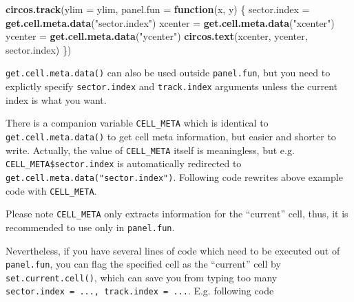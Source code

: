 \documentclass[]{book}
\newenvironment{Shaded}{\begin{snugshade}}{\end{snugshade}}
\newcommand{\KeywordTok}[1]{\textcolor[rgb]{0.13,0.29,0.53}{\textbf{#1}}}
\newcommand{\DataTypeTok}[1]{\textcolor[rgb]{0.13,0.29,0.53}{#1}}
\newcommand{\StringTok}[1]{\textcolor[rgb]{0.31,0.60,0.02}{#1}}
\newcommand{\ControlFlowTok}[1]{\textcolor[rgb]{0.13,0.29,0.53}{\textbf{#1}}}
\newcommand{\OperatorTok}[1]{\textcolor[rgb]{0.81,0.36,0.00}{\textbf{#1}}}
\newcommand{\NormalTok}[1]{#1}
\begin{document}
\begin{Shaded}
\begin{Highlighting}[]
\KeywordTok{circos.track}\NormalTok{(}\DataTypeTok{ylim =}\NormalTok{ ylim, }\DataTypeTok{panel.fun =} \ControlFlowTok{function}\NormalTok{(x, y) \{}
\NormalTok{    sector.index =}\StringTok{ }\KeywordTok{get.cell.meta.data}\NormalTok{(}\StringTok{"sector.index"}\NormalTok{)}
\NormalTok{    xcenter =}\StringTok{ }\KeywordTok{get.cell.meta.data}\NormalTok{(}\StringTok{"xcenter"}\NormalTok{)}
\NormalTok{    ycenter =}\StringTok{ }\KeywordTok{get.cell.meta.data}\NormalTok{(}\StringTok{"ycenter"}\NormalTok{)}
    \KeywordTok{circos.text}\NormalTok{(xcenter, ycenter, sector.index)}
\NormalTok{\})}
\end{Highlighting}
\end{Shaded}

\texttt{get.cell.meta.data()} can also be used outside
\texttt{panel.fun}, but you need to explictly specify
\texttt{sector.index} and \texttt{track.index} arguments unless the
current index is what you want.

There is a companion variable \texttt{CELL\_META} which is identical to
\texttt{get.cell.meta.data()} to get cell meta information, but easier
and shorter to write. Actually, the value of \texttt{CELL\_META} itself
is meaningless, but e.g. \texttt{CELL\_META\$sector.index} is
automatically redirected to \texttt{get.cell.meta.data("sector.index")}.
Following code rewrites above example code with \texttt{CELL\_META}.

\begin{Shaded}
\end{Shaded}

Please note \texttt{CELL\_META} only extracts information for the
``current'' cell, thus, it is recommended to use only in
\texttt{panel.fun}.

Nevertheless, if you have several lines of code which need to be
executed out of \texttt{panel.fun}, you can flag the specified cell as
the ``current'' cell by \texttt{set.current.cell()}, which can save you
from typing too many
\texttt{sector.index\ =\ ...,\ track.index\ =\ ...}. E.g. following code
\end{document}
